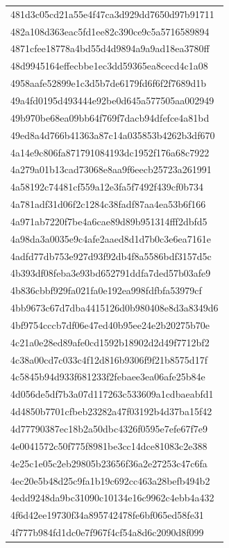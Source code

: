 \begin{tabular}{l}
481d3c05cd21a55e4f47ca3d929dd7650d97b91711 \\
482a108d363eac5fd1ee82c390ce9c5a5716589894 \\
4871cfee18778a4bd55d4d9894a9a9ad18ea3780ff \\
48d9945164effecbbe1ec3dd59365ea8cecd4c1a08 \\
4958aafe52899e1c3d5b7de6179fd6f6f2f7689d1b \\
49a4fd0195d493444e92be0d645a577505aa002949 \\
49b970be68ea09bb64f769f7dacb94dfefce4a81bd \\
49ed8a4d766b41363a87c14a035853b4262b3df670 \\
4a14e9c806fa871791084193dc1952f176a68c7922 \\
4a279a01b13cad73068e8aa9f6eecb25723a261991 \\
4a58192c74481cf559a12e3fa5f7492f439cf0b734 \\
4a781adf31d06f2c1284c38fadf87aa4ea53b6f166 \\
4a971ab7220f7be4a6cae89d89b951314fff2dbfd5 \\
4a98da3a0035e9c4afe2aaed8d1d7b0c3e6ea7161e \\
4adfd77db753e927d93f92db4f8a5586bdf3157d5c \\
4b393df08feba3e93bd652791ddfa7ded57b03afe9 \\
4b836cbbf929fa021fa0e192ea998fdfbfa53979cf \\
4bb9673c67d7dba4415126d0b980408e8d3a8349d6 \\
4bf9754cccb7df06e47ed40b95ee24e2b20275b70e \\
4c21a0e28ed89afe0cd1592b18902d2d49f7712bf2 \\
4c38a00cd7c033c4f12d816b9306f9f21b8575d17f \\
4c5845b94d933f681233f2febaee3ea06afe25b84e \\
4d056de5df7b3a07d117263c533609a1cdbaeabfd1 \\
4d4850b7701cfbeb23282a47f03192b4d37ba15f42 \\
4d77790387ec18b2a50dbc4326f0595e7efe67f7e9 \\
4e0041572c50f775f8981be3cc14dce81083c2e388 \\
4e25c1e05c2eb29805b23656f36a2e27253c47c6fa \\
4ec20e5b48d25c9fa1b19c692cc463a28befb494b2 \\
4edd9248da9bc31090c10134e16c9962c4ebb4a432 \\
4f6d42ee19730f34a895742478fe6bf065ed58fe31 \\
4f777b984fd1dc0e7f967f4cf54a8d6c2090d8f099 \\

\end{tabular}
